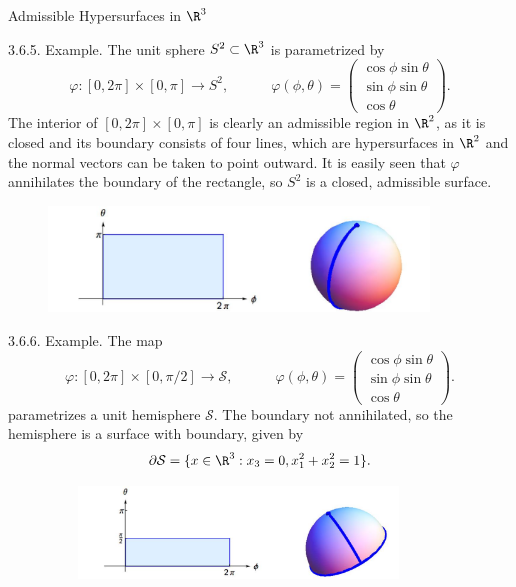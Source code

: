 \documentclass[smaller,hyperref={CJKbookmarks=true}]{beamer}
\begin{document}
\begin{frame}{Admissible Hypersurfaces in $\R^3$}
\begin{spacing}{0.9}
\alert{3.6.5. Example.} The unit sphere $S^2\subset\R^3$ is parametrized by
\[\varphi:[0,2\pi]\times[0,\pi]\to S^2,\qquad\quad\varphi(\phi,\theta)=\begin{pmatrix}
                                      \cos\phi\sin\theta \\
                                      \sin\phi\sin\theta \\
                                      \cos\theta
                                    \end{pmatrix}.\]
The interior of $[0,2\pi]\times[0,\pi]$ is clearly an admissible region in $\R^2$, as it is closed and its boundary consists of four lines, which are hypersurfaces in $\R^2$ and the normal vectors can be taken to point outward. It is easily seen that $\varphi$ annihilates the boundary of the rectangle, so $S^2$ is a closed, admissible surface.
\begin{figure}
  \centering
  \includegraphics[width=0.9\textwidth,height=80pt]{79.jpg}

\end{figure}
\newpage
\alert{3.6.6. Example.} The map
\[\varphi:[0,2\pi]\times[0,\pi/2]\to\mathcal{S},\qquad
\quad\varphi(\phi,\theta)=\begin{pmatrix}
                            \cos\phi\sin\theta \\
                            \sin\phi\sin\theta \\
                            \cos\theta
                          \end{pmatrix}.\]
parametrizes a unit hemisphere $\mathcal{S}$. The boundary not annihilated, so the
hemisphere is a surface with boundary, given by
\[\partial\mathcal{S}=\{x\in\R^3:x_3=0,x_1^2+x_2^2=1\}.\]
\begin{figure}
  \centering
  \includegraphics[width=0.9\textwidth,height=70pt]{80.jpg}

\end{figure}
\end{spacing}
\end{frame}
\end{document}
